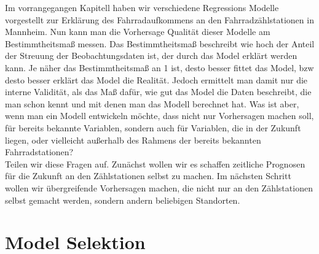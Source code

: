 \documentclass[a4paper,12pt]{thesis}
\begin{document}
Im vorrangegangen Kapitell haben wir verschiedene Regressions Modelle vorgestellt zur Erklärung des Fahrradaufkommens an den Fahrradzählstationen in Mannheim. Nun kann man die Vorhersage Qualität dieser Modelle am Bestimmtheitsmaß messen. Das Bestimmtheitsmaß beschreibt wie hoch der Anteil der Streuung der Beobachtungsdaten ist, der durch das Model erklärt werden kann. Je näher das Bestimmtheitsmaß an 1 ist, desto besser fittet das Model, bzw desto besser erklärt das Model die Realität. Jedoch ermittelt man damit nur die interne Validität, als das Maß dafür, wie gut das Model die Daten beschreibt, die man schon kennt und mit denen man das Modell berechnet hat. Was ist aber, wenn man ein Modell entwickeln möchte, dass nicht nur Vorhersagen machen soll, für bereits bekannte Variablen, sondern auch für Variablen, die in der Zukunft liegen, oder vielleicht außerhalb des Rahmens der bereits bekannten Fahrradstationen?\\
Teilen wir diese Fragen auf. Zunächst wollen wir es schaffen zeitliche Prognosen für die Zukunft an den Zählstationen selbst zu machen. Im nächsten Schritt wollen wir übergreifende Vorhersagen machen, die nicht nur an den Zählstationen selbst gemacht werden, sondern andern beliebigen Standorten.\\

\section{Model Selektion}
\end{document}
